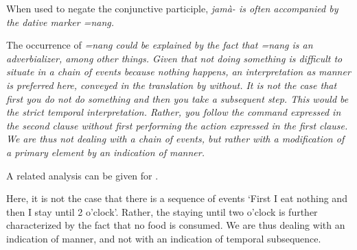 

When used to negate the conjunctive participle, \em jamà- \em is often accompanied by the dative marker \em =nang\em.

 

 
The occurrence of \em =nang \em could be explained by the fact that \em =nang \em is an adverbializer, among other things. Given that not doing something is difficult to situate in a chain of events because nothing happens, an interpretation as manner is preferred here, conveyed in the translation by \em without\em. It is not the case that first you do not do something and then you take a subsequent step. This would be the strict temporal interpretation. Rather, you follow the command expressed in the second clause \em without \em first performing the action expressed in the first clause. We are thus not dealing with a chain of events, but rather with a modification of a primary element by an indication of manner.

A related analysis can be given for .


Here, it is not the case that there is a sequence of events `First I eat nothing and then I stay until 2 o'clock'. Rather, the staying until two o'clock is further characterized by the fact that no food is consumed. We are thus dealing with an indication of manner, and not with an indication of temporal subsequence.

